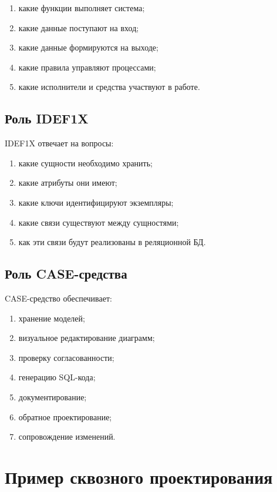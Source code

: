 \documentclass[12pt,a4paper]{article}
\theoremstyle{remark}
\begin{document}
\begin{enumerate}
    \item какие функции выполняет система;
    \item какие данные поступают на вход;
    \item какие данные формируются на выходе;
    \item какие правила управляют процессами;
    \item какие исполнители и средства участвуют в работе.
\end{enumerate}

\subsection{Роль IDEF1X}

IDEF1X отвечает на вопросы:

\begin{enumerate}
    \item какие сущности необходимо хранить;
    \item какие атрибуты они имеют;
    \item какие ключи идентифицируют экземпляры;
    \item какие связи существуют между сущностями;
    \item как эти связи будут реализованы в реляционной БД.
\end{enumerate}

\subsection{Роль CASE-средства}

CASE-средство обеспечивает:

\begin{enumerate}
    \item хранение моделей;
    \item визуальное редактирование диаграмм;
    \item проверку согласованности;
    \item генерацию SQL-кода;
    \item документирование;
    \item обратное проектирование;
    \item сопровождение изменений.
\end{enumerate}

\section{Пример сквозного проектирования}
\end{document}
